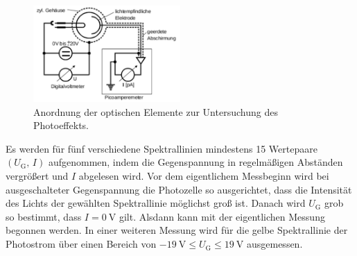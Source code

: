 \begin{figure}
	\centering
	\includegraphics[width=0.5\textwidth]{Bilder/Schaltbild.pdf}
	\caption{Anordnung der optischen Elemente zur Untersuchung des Photoeffekts.}
	\label{fig:schaltbild}
\end{figure}
Es werden für fünf verschiedene Spektrallinien mindestens 15 Wertepaare $\left(U_\mathup{G},\,I\right)$ aufgenommen, indem die Gegenspannung in regelmäßigen Abständen vergrößert und $I$ abgelesen wird.
Vor dem  eigentlichem Messbeginn wird bei ausgeschalteter Gegenspannung die Photozelle so ausgerichtet, dass die Intensität des Lichts der gewählten Spektrallinie möglichst groß ist. 
Danach wird $U_\mathup{G}$ grob so bestimmt, dass $I=\SI{0}{\volt}$ gilt. 
Alsdann kann mit der eigentlichen Messung begonnen werden.
In einer weiteren Messung wird für die gelbe Spektrallinie der Photostrom über einen Bereich von $\SI{-19}{\volt}\leqslant U_\mathup{G}\leqslant \SI{19}{\volt}$ ausgemessen.
